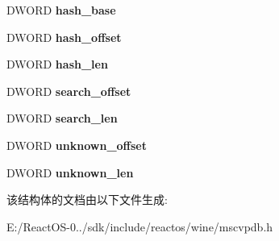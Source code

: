 \begin{DoxyCompactItemize}
D\+W\+O\+RD {\bfseries hash\+\_\+base}
\item 
\mbox{\label{struct___p_d_b___t_y_p_e_s_aa0310eff5c7453954fd6536b445a1828}} 
D\+W\+O\+RD {\bfseries hash\+\_\+offset}
\item 
\mbox{\label{struct___p_d_b___t_y_p_e_s_a9e89eec36c277854a96524d7dc291aec}} 
D\+W\+O\+RD {\bfseries hash\+\_\+len}
\item 
\mbox{\label{struct___p_d_b___t_y_p_e_s_a53b9d212f2aab713df95a0d2faa0736f}} 
D\+W\+O\+RD {\bfseries search\+\_\+offset}
\item 
\mbox{\label{struct___p_d_b___t_y_p_e_s_aa5ed82ee54cbcdbd36237caf1046fd02}} 
D\+W\+O\+RD {\bfseries search\+\_\+len}
\item 
\mbox{\label{struct___p_d_b___t_y_p_e_s_a3893557f0ea493fc7f077961b40e3eb5}} 
D\+W\+O\+RD {\bfseries unknown\+\_\+offset}
\item 
\mbox{\label{struct___p_d_b___t_y_p_e_s_ae8d381830e924d7213789011c4a346c0}} 
D\+W\+O\+RD {\bfseries unknown\+\_\+len}
\end{DoxyCompactItemize}


该结构体的文档由以下文件生成\+:\begin{DoxyCompactItemize}
\item 
E\+:/\+React\+O\+S-\/0../sdk/include/reactos/wine/mscvpdb.\+h\end{DoxyCompactItemize}
